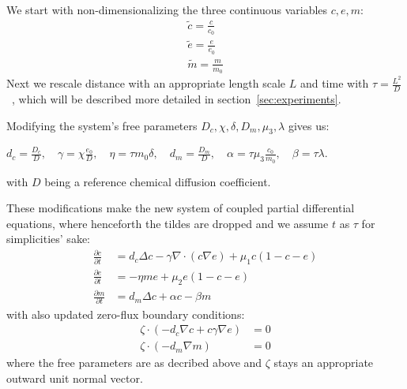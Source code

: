We start with non-dimensionalizing the three continuous variables $c,e,m$:
\begin{align*}
    \tilde{c} = \frac{c}{c_0} \\
    \tilde{e} = \frac{e}{e_0} \\
    \tilde{m} = \frac{m}{m_0}  
\end{align*}
Next we rescale distance with an appropriate length scale $L$ and time with $\tau = \frac{L^2}{D}$~\cite{anderson_mathematical_2000}, which will be described more detailed in section~\ref{sec:experiments}.

Modifying the system's free parameters $D_c, \chi, \delta, D_m, \mu_3, \lambda$ gives us: 
\begin{center}
    $d_c = \frac{D_c}{D},\quad \gamma = \chi \frac{e_0}{D},\quad \eta = \tau m_0 \delta,\quad d_m = \frac{D_m}{D},\quad \alpha = \tau \mu_3 \frac{c_0}{m_0},\quad \beta = \tau \lambda$.
\end{center} 
with $D$ being a reference chemical diffusion coefficient.

These modifications make the new system of coupled partial differential equations, where henceforth the tildes are dropped and we assume $t$ as $\tau$ for simplicities' sake:
\begin{align}
	\frac{\partial c}{\partial t} &= d_c \Delta c - \gamma \nabla \cdot (c\nabla e)  + \mu_1 c\left(1-c-e\right)\label{eq:6}\\
	\frac{\partial e}{\partial t} &= -\eta m e  + \mu_2 e\left(1-c-e\right)\label{eq:7}\\
	\frac{\partial m}{\partial t} &= d_m \Delta c + \alpha c - \beta m\label{eq:8}
\end{align}
with also updated zero-flux boundary conditions:
\begin{align}
	\zeta \cdot (-d_c \nabla c + c \gamma \nabla e) &= 0\label{eq:9}\\
	\zeta \cdot (-d_m\nabla m ) &= 0\label{eq:10}
\end{align}
where the free parameters are as decribed above and $\zeta$ stays an appropriate outward unit normal vector.
 
